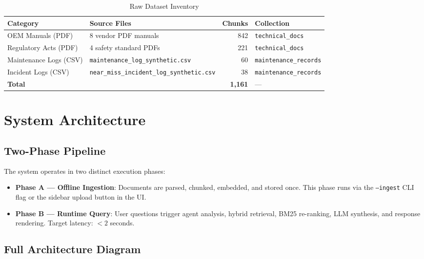 \documentclass[12pt,a4paper]{article}
\begin{document}
\begin{table}[htbp]
\centering
\caption{Raw Dataset Inventory}
\begin{tabular}{>{}p{3.8cm} p{4.8cm} r p{3.8cm}}
\toprule
\textbf{Category} & \textbf{Source Files} & \textbf{Chunks} & \textbf{Collection} \\
\midrule
OEM Manuals (PDF)      & 8 vendor PDF manuals  & 842  & \texttt{technical\_docs} \\
Regulatory Acts (PDF)  & 4 safety standard PDFs & 221  & \texttt{technical\_docs} \\
Maintenance Logs (CSV) & \small\texttt{maintenance\_log\_synthetic.csv} & 60 & \texttt{maintenance\_records} \\
Incident Logs (CSV)    & \small\texttt{near\_miss\_incident\_log\_synthetic.csv} & 38 & \texttt{maintenance\_records} \\
\midrule
\textbf{Total}         &                       & \textbf{1,161} & --- \\
\bottomrule
\end{tabular}
\end{table}

\section{System Architecture}

\subsection{Two-Phase Pipeline}

The system operates in two distinct execution phases:

\begin{itemize}[leftmargin=1.5em]
  \item \textbf{Phase A --- Offline Ingestion}: Documents are parsed, chunked, embedded, and stored once. This phase runs via the \texttt{--ingest} CLI flag or the sidebar upload button in the UI.
  \item \textbf{Phase B --- Runtime Query}: User questions trigger agent analysis, hybrid retrieval, BM25 re-ranking, LLM synthesis, and response rendering. Target latency: $< 2$ seconds.
\end{itemize}

\subsection{Full Architecture Diagram}
\end{document}
